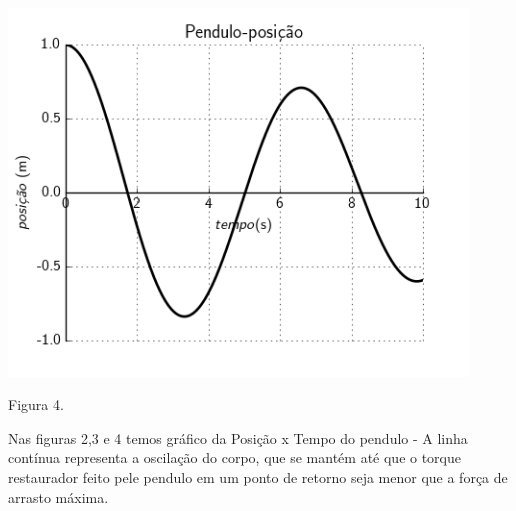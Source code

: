\documentclass[a4paper]{article} %
\begin{document}
\begin{center}	
	\includegraphics[width=4.80in,height=3.84in,keepaspectratio = false]{pendulo3_image1.png}
	
	\scriptsize Figura 4. 
	
\end{center}

Nas figuras 2,3 e 4 temos gr\'afico da Posi\c{c}\~ao x Tempo do pendulo - A linha cont\'inua representa a oscila\c{c}\~ao do corpo, que se mant\'em at\'e que o torque restaurador feito pele pendulo em um ponto de retorno seja menor que a for\c{c}a de arrasto m\'axima.
\end{document}
